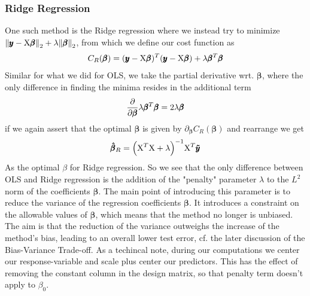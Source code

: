 \documentclass[reprint, english, nofootinbib]{revtex4-2}
\begin{document}
        \subsubsection{Ridge Regression}
            \noindent
            One such method is the Ridge regression where we instead try to minimize $\norm{\pmb y - \textup{X}\pmb \beta}_2 + \lambda\norm{\pmb \beta}_2$, from which we define our cost function as
            \begin{equation}
                C_{R}(\pmb \beta)
                = (\pmb y - \textup{X}\pmb\beta)^T(\pmb y - \textup{X}\pmb\beta)
                + \lambda \pmb\beta^T\pmb\beta
            \end{equation}
            Similar for what we did for OLS, we take the partial derivative wrt. $\pmb \beta$, where the only difference in finding the minima resides in the additional term
            \begin{equation}
                \pdv{\pmb \beta} \lambda \pmb\beta^T\pmb\beta = 2\lambda\pmb\beta
            \end{equation}
            if we again assert that the optimal $\pmb\beta$ is given by $\partial_{\pmb\beta}C_R(\pmb\beta)$ and rearrange we get
            \begin{equation}
                \pmb{\hat\beta}_R = \qty(\textup{X}^T\textup{X}  + \lambda)^{-1}\textup{X}^T\pmb{\tilde y}
            \end{equation}
            As the optimal $\beta$ for Ridge regression.
            So we see that the only difference between OLS and Ridge regression is the addition of the "penalty" parameter $\lambda$ to the $L^2$ norm of the coefficients $\pmb{\beta}$. The main point of introducing this parameter is to reduce the variance of the regression coefficients $\pmb{\beta}$. It introduces a constraint on the allowable values of $\pmb{\beta}$, which means that the method no longer is unbiased. The aim is that the reduction of the variance outweighs the increase of the method's bias, leading to an overall lower test error, cf. the later discussion of the Bias-Variance Trade-off. As a techincal note, during our computations we center our response-variable and scale plus center our predictors. This has the effect of removing the constant column in the design matrix, so that penalty term doesn't apply to $\beta_{0}$.
\end{document}
